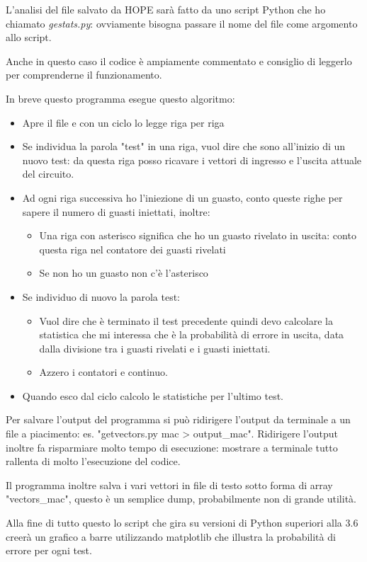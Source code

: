 \documentclass[12pt, letterpaper]{article}
\begin{document}
L'analisi del file salvato da HOPE sarà fatto da uno script Python che ho chiamato \textit{gestats.py}: ovviamente  bisogna passare il nome del file come argomento allo script.

Anche in questo caso il codice è ampiamente commentato e consiglio di leggerlo per comprenderne il funzionamento. 

In breve questo programma esegue questo algoritmo: 
\begin{itemize}
\item Apre il file e con un ciclo lo legge riga per riga
\item Se individua la parola "test" in una riga, vuol dire che sono all'inizio di un nuovo test: da questa riga posso ricavare i vettori di ingresso e l'uscita attuale del circuito.
\item Ad ogni riga successiva ho l'iniezione di un guasto, conto queste righe per sapere il numero di guasti iniettati, inoltre:
\begin{itemize}
\item Una riga con asterisco significa che ho un guasto rivelato in uscita: conto questa riga nel contatore dei guasti rivelati
\item Se non ho un guasto non c'è l'asterisco
\end{itemize}
\item Se individuo di nuovo la parola test:
\begin{itemize}
\item Vuol dire che è terminato il test precedente quindi devo calcolare la statistica che mi interessa che è la probabilità di errore in uscita, data dalla divisione tra i guasti rivelati e i guasti iniettati.
\item Azzero i contatori e continuo.
\end{itemize}
\item Quando esco dal ciclo calcolo le statistiche per l'ultimo test.
\end{itemize}

Per salvare l'output del programma si può ridirigere l'output da terminale a un file a piacimento: es. "getvectors.py mac > output\_mac".
Ridirigere l'output inoltre fa risparmiare molto tempo di esecuzione: mostrare a terminale tutto rallenta di molto l'esecuzione del codice.

Il programma inoltre salva i vari vettori in file di testo sotto forma di array "vectors\_mac", questo è un semplice dump, probabilmente non di grande utilità.

Alla fine di tutto questo lo script che gira su versioni di Python superiori alla 3.6 creerà un grafico a barre utilizzando matplotlib che illustra la probabilità di errore per ogni test.
\end{document}
